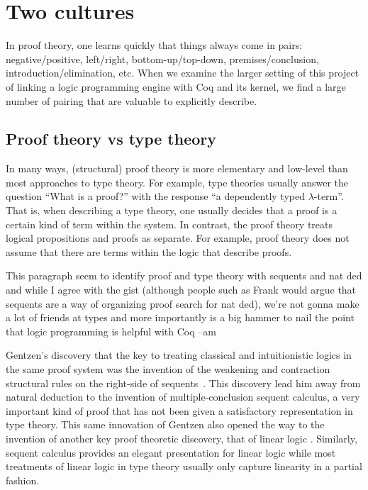 \documentclass[a4paper,USenglish,cleveref, autoref, thm-restate]{lipics-v2019}
\begin{document}
\section{Two cultures}

In proof theory, one learns quickly that things always come in pairs:
negative/positive, left/right, bottom-up/top-down,
premises/conclusion, introduction/elimination,
etc.
%
When we examine the larger setting of this project of linking a logic
programming engine with Coq and its kernel, we find a large number of
pairing that are valuable to explicitly describe.

\subsection{Proof theory vs type theory}

In many ways, (structural) proof theory is more elementary and
low-level than most approaches to type theory.  For example, type
theories usually answer the question ``What is a proof?'' with the
response ``a dependently typed $\lambda$-term''.  That is, when
describing a type theory, one usually decides that a proof is a
certain kind of term within the system.  In contrast, the proof theory
treats logical propositions and proofs as separate.  For example,
proof theory does not assume that there are terms within the logic
that describe proofs.

\begin{metanote}
  This paragraph seem to identify proof and type theory with sequents and nat ded and while
  I agree with the gist (although people such as Frank would argue that sequents are a way of organizing proof search for nat ded), we're not gonna make a lot of friends at types and more importantly is a big hammer to nail the point that logic programming is helpful with Coq --am 
\end{metanote}

Gentzen's discovery that the key to treating classical and
intuitionistic logics in the same proof system was the invention of
the weakening and contraction structural rules on the right-side of
sequents~\cite{gentzen35}.  This discovery lead him away from natural
deduction to the invention of multiple-conclusion sequent calculus, a
very important kind of proof that has not been given a satisfactory
representation in type theory.  This same innovation of Gentzen also
opened the way to the invention of another key proof theoretic
discovery, that of linear logic \cite{girard87tcs}.
Similarly, sequent calculus provides an elegant presentation for
linear logic while most treatments of linear logic in type theory
usually only capture linearity in a partial fashion.
\end{document}
